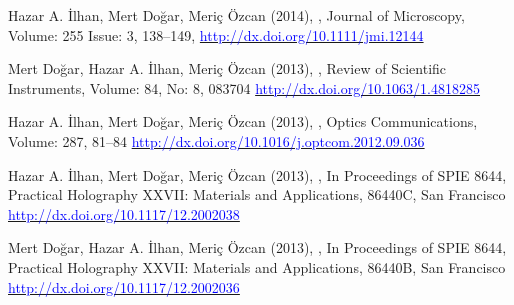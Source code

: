 \documentclass[11pt,a4paper,helvet]{moderncv}
\begin{document}
\begin{thebibliography}{}

\bibitem {}
Hazar A. \.Ilhan, Mert Do\u{g}ar, Meri\c{c} \"Ozcan (2014),
,
\newblock Journal of Microscopy, Volume: 255 Issue: 3, 138--149, 
\newblock \newline{} \href{http://dx.doi.org/10.1111/jmi.12144}{\textcolor{blue}{http://dx.doi.org/10.1111/jmi.12144}}

\bibitem {}
Mert Do\u{g}ar, Hazar A. \.Ilhan, Meri\c{c} \"Ozcan (2013),
,
\newblock Review of Scientific Instruments, Volume: 84, No: 8, 083704
\newblock \newline{} \href{http://dx.doi.org/10.1063/1.4818285}{\textcolor{blue}{http://dx.doi.org/10.1063/1.4818285}}

\bibitem {}
Hazar A. \.Ilhan, Mert Do\u{g}ar, Meri\c{c} \"Ozcan (2013),
,
\newblock Optics Communications, Volume: 287, 81--84
\newblock \newline{} \href{http://dx.doi.org/10.1016/j.optcom.2012.09.036}{\textcolor{blue}{http://dx.doi.org/10.1016/j.optcom.2012.09.036}}

\bibitem {}
Hazar A. \.Ilhan, Mert Do\u{g}ar, Meri\c{c} \"Ozcan (2013),
,
\newblock In Proceedings of SPIE 8644, Practical Holography XXVII: Materials and Applications, 86440C, San Francisco
\newblock \newline{} \href{http://dx.doi.org/10.1117/12.2002038}{\textcolor{blue}{http://dx.doi.org/10.1117/12.2002038}}

\bibitem {}
Mert Do\u{g}ar, Hazar A. \.Ilhan, Meri\c{c} \"Ozcan (2013),
,
\newblock In Proceedings of SPIE 8644, Practical Holography XXVII: Materials and Applications, 86440B, San Francisco
\newblock \newline{} \href{http://dx.doi.org/10.1117/12.2002036}{\textcolor{blue}{http://dx.doi.org/10.1117/12.2002036}}

\end{thebibliography}
\end{document}
